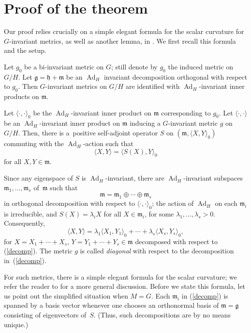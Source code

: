 \documentclass[10pt,a4paper]{amsart}
\begin{document}
\section{Proof of the theorem}

Our proof relies crucially on a simple elegant formula for the scalar curvature for $G$-invariant metrics, as well as another lemma, in \cite{12}. We first recall this formula and the setup.

Let $g_0$ be a bi-invariant metric on $G$; still denote by $g_0$ the induced metric on $G/H$. Let $\mathfrak{g}=\mathfrak{h} + \mathfrak{m}$ be an $\operatorname{Ad}_H$ invariant decomposition orthogonal with respect to $g_0$. Then $G$-invariant metrics on $G/H$ are identified with $\operatorname{Ad}_H$-invariant inner products on $\mathfrak{m}$.

Let $\langle \cdot, \cdot \rangle_0$ be the $\operatorname{Ad}_H$-invariant inner product on $\mathfrak{m}$ corresponding to $g_0$. Let $\langle \cdot, \cdot \rangle$ be an $\operatorname{Ad}_H$-invariant inner product on $\mathfrak{m}$ inducing a $G$-invariant metric $g$ on $G/H$. Then, there is a~positive self-adjoint operator $S$ on $(\mathfrak{m},\langle X,Y\rangle_0)$ commuting with the $\operatorname{Ad}_H$-action such that
\[ \langle X,Y\rangle=\langle S(X),Y\rangle_0\]
for all $X,Y\in \mathfrak{m}$.

Since any eigenspace of $S$ is $\operatorname{Ad}_H$-invariant, there are $\operatorname{Ad}_H$-invariant subspaces $\mathfrak{m}_1, \dots , \mathfrak{m}_s$ of~$\mathfrak{m}$ such that
\begin{equation} \label{decomp}
\mathfrak{m} = \mathfrak{m}_1 \oplus \cdots \oplus \mathfrak{m}_s
\end{equation}
in orthogonal decomposition with respect to $\langle \cdot, \cdot \rangle_0$; the action of $\operatorname{Ad}_H$ on each $\mathfrak{m}_i$ is irreducible, and $S(X)=\lambda_i X$ for all $X\in\mathfrak{m}_i$, for some $\lambda_1,\dots,\lambda_s>0$. Consequently,
\[
\langle X,Y\rangle=\lambda_1 \langle X_1,Y_1\rangle_0 + \cdots + \lambda_s \langle X_s,Y_s\rangle_0,
\]
for $X=X_1+\cdots+X_s$, $Y=Y_1+\cdots+Y_s\in \mathfrak{m}$ decomposed with
respect to (\ref{decomp}). The metric $g$ is called \textit{diagonal} with respect to
the decomposition in~(\ref{decomp}).

For such metrics, there is a simple elegant formula for the scalar curvature; we refer the reader to \cite{12} for a more general discussion. Before we state this formula, let us point out the simplified situation when $M=G$.
Each $\mathfrak{m}_i$ in (\ref{decomp}) is spanned by a basis vector whenever one chooses an orthonormal basis of $\mathfrak{m}=\mathfrak{g}$ consisting of eigenvectors of~$S$. (Thus, such decompositions are by no means unique.)
\end{document}
